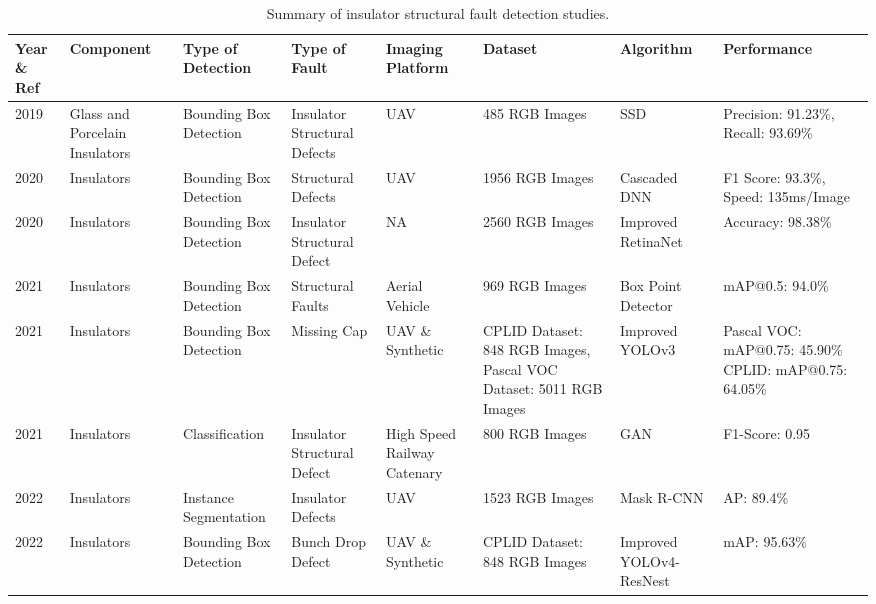{\scriptsize
\begin{longtable}{P{.05} P{.1} P{.1} P{.1} P{.1} P{.15} P{.1} P{.1}} \caption{Summary of insulator structural fault detection studies.}
\label{tab:insulator_structural_faults} \\
\hline  

Year \& Ref & Component & Type of Detection & Type of Fault & Imaging Platform & Dataset & Algorithm & Performance \\ 
\hline 

2019 \cite{jiang_insulator_2019} & Glass and Porcelain Insulators & Bounding Box Detection & Insulator Structural Defects & UAV & 485 RGB Images & SSD & Precision: 91.23\%, Recall: 93.69\% \\

2020 \cite{tao_detection_2020} & Insulators & Bounding Box Detection & Structural Defects & UAV & 1956 RGB Images & Cascaded DNN & F1 Score: 93.3\%, Speed: 135ms/Image \\

2020 \cite{wang_detection_2020} & Insulators & Bounding Box Detection & Insulator Structural Defect & NA & 2560 RGB Images & Improved RetinaNet & Accuracy: 98.38\% \\

2021 \cite{liu_box_point_2021} & Insulators & Bounding Box Detection & Structural Faults & Aerial Vehicle & 969 RGB Images & Box Point Detector & mAP@0.5: 94.0\% \\

2021 \cite{zhang_insudet_2021} & Insulators & Bounding Box Detection & Missing Cap & UAV \& Synthetic & CPLID Dataset: 848 RGB Images, Pascal VOC Dataset: 5011 RGB Images & Improved YOLOv3 & Pascal VOC: mAP@0.75: 45.90\% CPLID: mAP@0.75: 64.05\% \\

2021 \cite{zhang_defgan_2021} & Insulators & Classification & Insulator Structural Defect & High Speed Railway Catenary & 800 RGB Images & GAN & F1-Score: 0.95 \\

2022 \cite{antwi_bekoe_deep_2022} & Insulators & Instance Segmentation & Insulator Defects & UAV & 1523 RGB Images & Mask R-CNN & AP: 89.4\% \\

2022 \cite{hao_insulator_2022} & Insulators & Bounding Box Detection & Bunch Drop Defect & UAV \& Synthetic & CPLID Dataset: 848 RGB Images & Improved YOLOv4-ResNest & mAP: 95.63\% \\


\end{longtable}}
